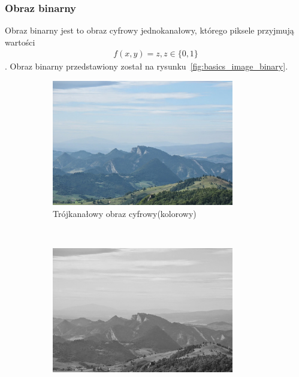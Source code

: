 \subsubsection{Obraz binarny}
Obraz binarny jest to obraz cyfrowy jednokanałowy, którego piksele przyjmują wartości
\begin{gather*}
  f(x, y) = z, z \in \{0, 1\}
\end{gather*}.
Obraz binarny przedstawiony został na rysunku~\ref{fig:basics_image_binary}.
\begin{figure}
  \centering
  \begin{subfigure}[b]{0.45\textwidth}
    \includegraphics[width=\textwidth]{img/basics-image-color}
    \caption{Trójkanałowy obraz cyfrowy(kolorowy)}
    \label{fig:basics_image_color}
  \end{subfigure}
  ~
  \begin{subfigure}[b]{0.45\textwidth}
    \includegraphics[width=\textwidth]{img/basics-image-gray}

\end{subfigure}
\end{figure}
